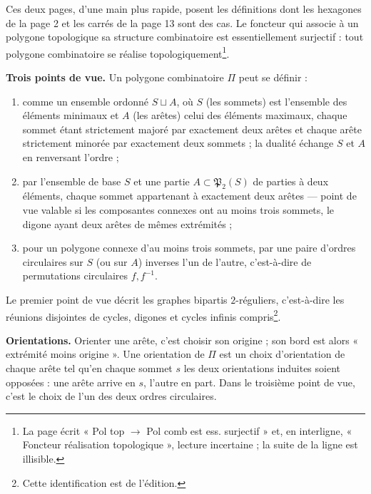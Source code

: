 \documentclass[11pt,a4paper]{article}
\begin{document}
Ces deux pages, d'une main plus rapide, posent les définitions dont les
hexagones de la page 2 et les carrés de la page 13 sont des cas. Le foncteur
qui associe à un polygone topologique sa structure combinatoire est
essentiellement surjectif : tout polygone combinatoire se réalise
topologiquement\footnote{La page écrit « Pol top $\to$ Pol comb est ess.
surjectif » et, en interligne, « Foncteur réalisation topologique », lecture
incertaine ; la suite de la ligne est illisible.}.

\textbf{Trois points de vue.} Un polygone combinatoire $\Pi$ peut se définir :
\begin{enumerate}
  \item comme un ensemble ordonné $S \sqcup A$, où $S$ (les sommets) est l'ensemble
    des éléments minimaux et $A$ (les arêtes) celui des éléments maximaux, chaque
    sommet étant strictement majoré par exactement deux arêtes et chaque arête
    strictement minorée par exactement deux sommets ; la dualité échange $S$ et
    $A$ en renversant l'ordre ;
  \item par l'ensemble de base $S$ et une partie $A \subset \mathfrak{P}_2(S)$ de
    parties à deux éléments, chaque sommet appartenant à exactement deux arêtes —
    point de vue valable si les composantes connexes ont au moins trois sommets,
    le digone ayant deux arêtes de mêmes extrémités ;
  \item pour un polygone connexe d'au moins trois sommets, par une paire d'ordres
    circulaires sur $S$ (ou sur $A$) inverses l'un de l'autre, c'est-à-dire de
    permutations circulaires $f, f^{-1}$.
\end{enumerate}
Le premier point de vue décrit les graphes bipartis $2$-réguliers, c'est-à-dire
les réunions disjointes de cycles, digones et cycles infinis compris\footnote{Cette identification
est de l'édition.}.

\textbf{Orientations.} Orienter une arête, c'est choisir son origine ; son bord est
alors « extrémité moins origine ». Une orientation de $\Pi$ est un choix
d'orientation de chaque arête tel qu'en chaque sommet $s$ les deux orientations
induites soient opposées : une arête arrive en $s$, l'autre en part. Dans le
troisième point de vue, c'est le choix de l'un des deux ordres circulaires.
\end{document}
